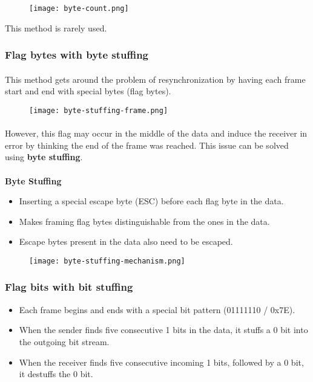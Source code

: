 \documentclass[../resumosRCOM.tex]{subfiles}
\begin{document}
\begin{figure}[h]
    \centering
    \texttt{[image: byte-count.png]}
\end{figure}

This method is rarely used.

\subsubsection{Flag bytes with byte stuffing}
\paragraph{}
This method gets around the problem of resynchronization by having each frame
start and end with special bytes (flag bytes).

\begin{figure}[h]
    \centering
    \texttt{[image: byte-stuffing-frame.png]}
\end{figure}

\paragraph{}
However, this flag may occur in the middle of the data and induce the receiver
in error by thinking the end of the frame was reached. This issue can be solved
using \textbf{byte stuffing}.

\paragraph{}
\textbf{Byte Stuffing}
\begin{itemize}
    \item Inserting a special escape byte (ESC) before each flag byte in 
    the data.
    \item Makes framing flag bytes distinguishable from the ones in the data.
    \item Escape bytes present in the data also need to be escaped.
\end{itemize}
 
\begin{figure}[h]
    \centering
    \texttt{[image: byte-stuffing-mechanism.png]}
\end{figure}

\subsubsection{Flag bits with bit stuffing}
\begin{itemize}
    \item Each frame begins and ends with a special bit pattern (01111110 / 0x7E).
    \item When the sender finds five consecutive 1 bits in the data, it stuffs a 0 bit
    into the outgoing bit stream.
    \item When the receiver finds five consecutive incoming 1 bits, followed by a 0
    bit, it destuffs the 0 bit.    
\end{itemize}
\end{document}
